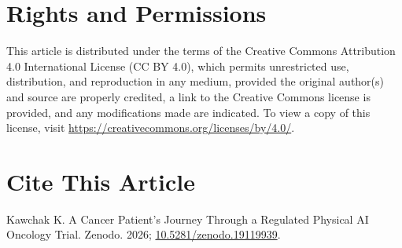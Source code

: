 \section*{Rights and Permissions}
\vspace{-0.2cm}
This article is distributed under the terms of the Creative Commons Attribution 4.0 International License (CC BY 4.0), which permits unrestricted use, distribution, and reproduction in any medium, provided the original author(s) and source are properly credited, a link to the Creative Commons license is provided, and any modifications made are indicated. To view a copy of this license, visit \url{https://creativecommons.org/licenses/by/4.0/}.
\vspace{-0.2cm}
\section*{Cite This Article}
\vspace{-0.2cm}
Kawchak K. A Cancer Patient's Journey Through a Regulated Physical AI Oncology Trial. Zenodo. 2026; \href{https://doi.org/10.5281/zenodo.19119939}{10.5281/zenodo.19119939}.



